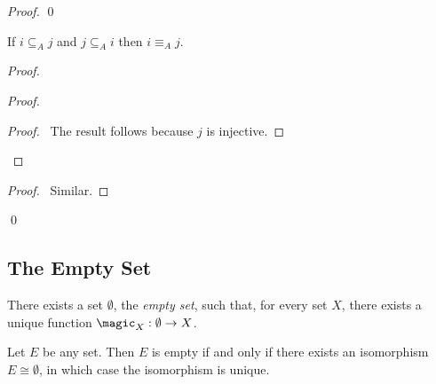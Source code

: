 \begin{proof}
  \pf
  \qed
\end{proof}

\begin{prop}
  If $i \subseteq_A j$ and $j \subseteq_A i$ then $i \equiv_A j$.
\end{prop}

\begin{proof}
  \pf
  \begin{proof}
    \qedstep
    \begin{proof}
      \pf\ The result follows because $j$ is injective.
    \end{proof}
  \end{proof}
  \begin{proof}
    \pf\ Similar.
  \end{proof}
  \qed
\end{proof}

\subsection{The Empty Set}

\begin{ax}
  There exists a set $\emptyset$, the \emph{empty set}, such that, for every
  set $X$, there exists a unique function $\magic_X : \emptyset \rightarrow
  X$.
\end{ax}

\begin{prop}
  \label{prop:sets:empty:unique}
  Let $E$ be any set. Then $E$ is empty if and only if there exists an isomorphism $E \cong \emptyset$, in which case the isomorphism is unique.
\end{prop}

